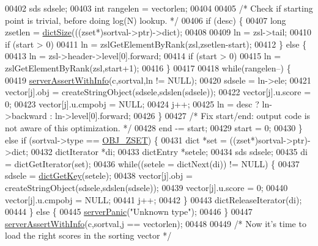 \begin{DoxyCode}
00402         sds sdsele;
00403         \textcolor{keywordtype}{int} rangelen = vectorlen;
00404 
00405         \textcolor{comment}{/* Check if starting point is trivial, before doing log(N) lookup. */}
00406         \textcolor{keywordflow}{if} (desc) \{
00407             \textcolor{keywordtype}{long} zsetlen = \hyperlink{dict_8h_af193430dd3d5579a52b194512f72c1f0}{dictSize}(((zset*)sortval->ptr)->dict);
00408 
00409             ln = zsl->tail;
00410             \textcolor{keywordflow}{if} (start > 0)
00411                 ln = zslGetElementByRank(zsl,zsetlen-start);
00412         \} \textcolor{keywordflow}{else} \{
00413             ln = zsl->header->level[0].forward;
00414             \textcolor{keywordflow}{if} (start > 0)
00415                 ln = zslGetElementByRank(zsl,start+1);
00416         \}
00417 
00418         \textcolor{keywordflow}{while}(rangelen--) \{
00419             \hyperlink{server_8h_a7308f76cbff9a8d3797fe78190b91282}{serverAssertWithInfo}(c,sortval,ln != NULL);
00420             sdsele = ln->ele;
00421             vector[j].obj = createStringObject(sdsele,sdslen(sdsele));
00422             vector[j].u.score = 0;
00423             vector[j].u.cmpobj = NULL;
00424             j++;
00425             ln = desc ? ln->backward : ln->level[0].forward;
00426         \}
00427         \textcolor{comment}{/* Fix start/end: output code is not aware of this optimization. */}
00428         end -= start;
00429         start = 0;
00430     \} \textcolor{keywordflow}{else} \textcolor{keywordflow}{if} (sortval->type == \hyperlink{server_8h_a8c356422ddbc03bd77694880a30a1953}{OBJ\_ZSET}) \{
00431         dict *set = ((zset*)sortval->ptr)->dict;
00432         dictIterator *di;
00433         dictEntry *setele;
00434         sds sdsele;
00435         di = dictGetIterator(set);
00436         \textcolor{keywordflow}{while}((setele = dictNext(di)) != NULL) \{
00437             sdsele =  \hyperlink{dict_8h_a3271c334309904a3086deca94f96e46e}{dictGetKey}(setele);
00438             vector[j].obj = createStringObject(sdsele,sdslen(sdsele));
00439             vector[j].u.score = 0;
00440             vector[j].u.cmpobj = NULL;
00441             j++;
00442         \}
00443         dictReleaseIterator(di);
00444     \} \textcolor{keywordflow}{else} \{
00445         \hyperlink{server_8h_a11cc378e7778a830b41240578de3b204}{serverPanic}(\textcolor{stringliteral}{"Unknown type"});
00446     \}
00447     \hyperlink{server_8h_a7308f76cbff9a8d3797fe78190b91282}{serverAssertWithInfo}(c,sortval,j == vectorlen);
00448 
00449     \textcolor{comment}{/* Now it's time to load the right scores in the sorting vector */}

\end{DoxyCode}
